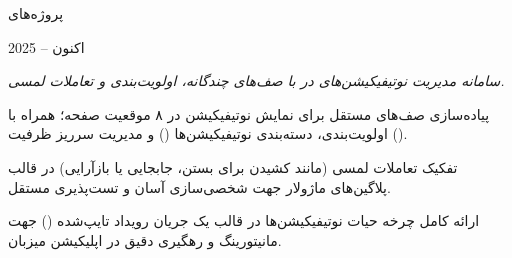 \documentclass[
	a4paper,
	11pt,
]{resume_fa}
\begin{document}
\begin{rSection}{پروژه‌های }
    \begin{rSubsection}{}{2025 -- اکنون}{}{ \hfill \footnotesize\textcolor{bluegray}{\faClean{\faGithubAlt}~~\textperiodcentered~\faClean{\faCube}~~\textperiodcentered~\faClean{\faDesktop}~}}
        \item[] {\small\textsl{سامانه مدیریت نوتیفیکیشن‌های  در  با صف‌های چندگانه، اولویت‌بندی و تعاملات لمسی.}}
        \item پیاده‌سازی صف‌های مستقل برای نمایش نوتیفیکیشن در ۸ موقعیت صفحه؛ همراه با اولویت‌بندی، دسته‌بندی نوتیفیکیشن‌ها () و مدیریت سرریز ظرفیت ().
        \item تفکیک تعاملات لمسی (مانند کشیدن برای بستن، جابجایی یا بازآرایی) در قالب پلاگین‌های ماژولار  جهت شخصی‌سازی آسان و تست‌پذیری مستقل.
        \item ارائه کامل چرخه حیات نوتیفیکیشن‌ها در قالب یک جریان رویداد تایپ‌شده () جهت مانیتورینگ و رهگیری دقیق در اپلیکیشن میزبان.
        \\      
    \end{rSubsection}

\end{rSection}

\newpage

\end{document}
